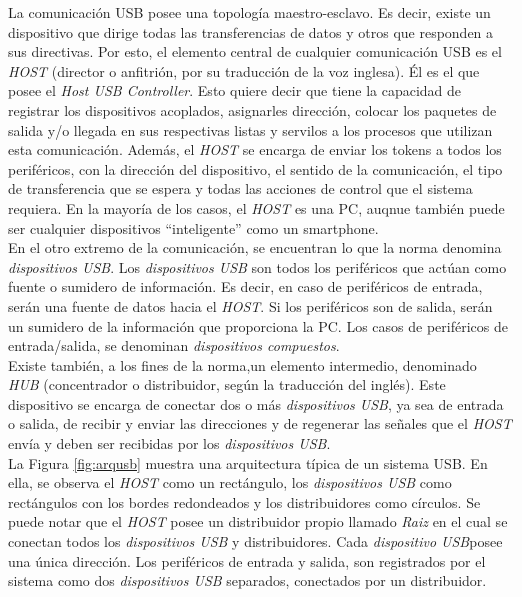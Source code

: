 	La comunicación USB posee una topología maestro-esclavo. Es decir, existe un dispositivo que dirige todas las transferencias de datos y otros que responden a sus directivas. Por esto, el elemento central de cualquier comunicación USB es el {\it HOST} (director o anfitrión, por su traducción de la voz inglesa). Él es el que posee el {\it Host USB Controller}\cite{USBspec}. Esto quiere decir que tiene la capacidad de registrar los dispositivos acoplados, asignarles dirección, colocar los paquetes de salida y/o llegada en sus respectivas listas y servilos a los procesos que utilizan esta comunicación. Además, el {\it HOST} se encarga de enviar los tokens a todos los periféricos, con la dirección del dispositivo, el sentido de la comunicación, el tipo de transferencia que se espera y todas las acciones de control que el sistema requiera. En la mayoría de los casos, el {\it HOST} es una PC, auqnue también puede ser cualquier dispositivos  ``inteligente'' como un smartphone.\\
	
	En el otro extremo de la comunicación, se encuentran lo que la norma denomina {\it dispositivos USB}\cite{USBspec}. Los {\it dispositivos USB} son todos los periféricos que actúan como fuente o sumidero de información. Es decir, en caso de periféricos de entrada, serán una fuente de datos hacia el {\it HOST}. Si los periféricos son de salida, serán un sumidero de la información que proporciona la PC. Los casos de periféricos de entrada/salida, se denominan {\it dispositivos compuestos}.\\
		
	Existe también, a los fines de la norma,un elemento intermedio, denominado {\it HUB} (concentrador o distribuidor, según la traducción del inglés). Este dispositivo se encarga de conectar dos o más {\it dispositivos USB}, ya sea de entrada o salida, de recibir y enviar las direcciones y de regenerar las señales que el {\it HOST} envía y deben ser recibidas por los {\it dispositivos USB}.\\
	
	La Figura \ref{fig:arqusb} muestra una arquitectura típica de un sistema USB. En ella, se observa el {\it HOST} como un rectángulo, los {\it dispositivos USB} como rectángulos con los bordes redondeados y los distribuidores como círculos. Se puede notar que el {\it HOST} posee un distribuidor propio llamado {\it Raiz} en el cual se conectan todos los {\it dispositivos USB } y distribuidores. Cada {\it dispositivo USB}posee una única dirección. Los periféricos de entrada y salida, son registrados por el sistema como dos {\it dispositivos USB} separados, conectados por un distribuidor.
	
